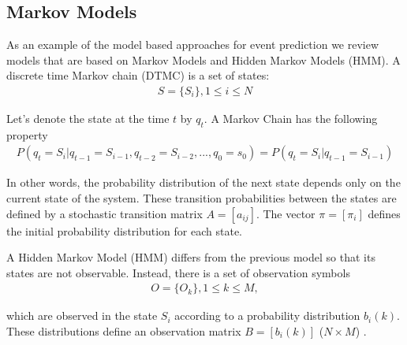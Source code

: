 \subsection{Markov Models}
As an example of the model based approaches for event prediction we review models that are based on Markov Models and Hidden Markov Models (HMM). A discrete time Markov chain (DTMC) is a set of states:
\begin{align*}
S = \{S_i\}, 1 \le i \le N
\end{align*}

Let's denote the state at the time $t$ by $q_t$. A Markov Chain has the following property
\begin{align*}
P(q_t = S_i | q_{t-1} = S_{i-1}, q_{t-2} = S_{i-2}, ..., q_0 = s_0) = P(q_t = S_i | q_{t-1} = S_{i-1})
\end{align*}

In other words, the probability distribution of the next state depends only on the current state of the system. These transition probabilities between the states are defined by a stochastic transition matrix $A = [a_{ij}]$. The vector $\pi = [\pi_i]$ defines the initial probability distribution for each state.

A Hidden Markov Model (HMM) differs from the previous model so that its states are not observable. Instead, there is a set of observation symbols
\begin{align*}
O = \{O_k\}, 1 \le k \le M,
\end{align*}

which are observed in the state $S_i$ according to a probability distribution $b_i(k)$. These distributions define an observation matrix $B = [b_i(k)]$ ($N \times M$) \cite{rabiner89}.






